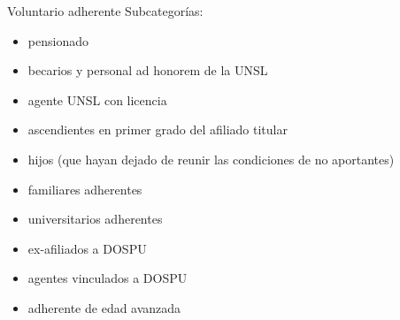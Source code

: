 \documentclass[10pt]{beamer}
\begin{document}
\begin{frame}{Voluntario adherente}
    Subcategorías:
    \begin{itemize}
        \item pensionado
        \item becarios y personal ad honorem de la UNSL
        \item agente UNSL con licencia
        \item ascendientes en primer grado del afiliado titular
        \item hijos (que hayan dejado de reunir las condiciones de no aportantes)
        \item familiares adherentes
        \item universitarios adherentes
        \item ex-afiliados a DOSPU
        \item agentes vinculados a DOSPU
        \item adherente de edad avanzada
    \end{itemize}
\end{frame}

\end{document}
